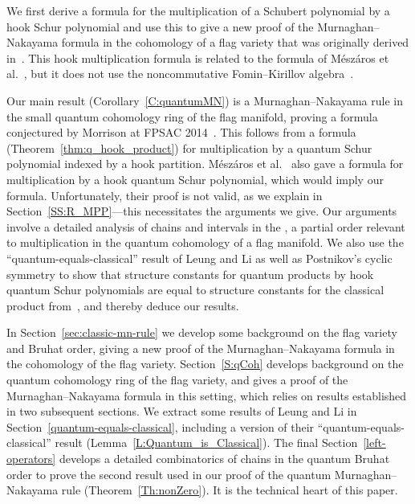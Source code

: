We first derive a formula for the multiplication of a Schubert polynomial by a hook Schur polynomial and use this to give a
new proof of the 
Murnaghan--Nakayama formula in the cohomology of a flag variety that was originally derived in~\cite{MorrisonSottile}.
This hook multiplication formula is related to the formula of M{\'e}sz{\'a}ros et al.~\cite[Thm.~2]{MPP}, but it does not use
the noncommutative Fomin--Kirillov algebra~\cite{FominKirillov}.

Our main result (Corollary~\ref{C:quantumMN}) is a Murnaghan--Nakayama rule in the small quantum cohomology
ring of the flag manifold, proving a formula conjectured by Morrison at FPSAC
2014~\cite{Morrison}.
This follows from a  formula (Theorem~\ref{thm:q_hook_product}) for multiplication by a quantum Schur polynomial indexed by
a hook partition. 
M{\'e}sz{\'a}ros et al.~\cite[Thm.~15]{MPP} also gave a formula for multiplication by a hook quantum Schur
polynomial, which would imply our formula.
Unfortunately, their proof is not valid, as we explain in Section~\ref{SS:R_MPP}---this necessitates the arguments we give.
Our arguments involve a detailed analysis of chains and intervals in the , a partial order relevant to
multiplication in the quantum cohomology of a flag manifold.
We also use the ``quantum-equals-classical'' result of Leung and Li \cite{LeungLi2012} as well as
Postnikov's cyclic symmetry \cite{Postnikov_symmetry} to show that structure constants for quantum products by hook quantum
Schur 
polynomials are equal to structure constants for the classical product from~\cite{So96}, and thereby deduce our results.

In Section~\ref{sec:classic-mn-rule} we develop some background on the flag variety and Bruhat order, giving a new proof of the
Murnaghan--Nakayama formula in the cohomology of the flag variety.
Section~\ref{S:qCoh} develops background on the quantum cohomology ring of the flag variety, and gives a proof of the 
Murnaghan--Nakayama formula in this setting, which relies on results established in two subsequent
sections.
We extract some results of Leung and Li \cite{LeungLi2012} in Section~\ref{quantum-equals-classical}, including a version
of their  ``quantum-equals-classical'' result (Lemma~\ref{L:Quantum_is_Classical}).
The final Section~\ref{left-operators} develops a detailed combinatorics of chains in the quantum Bruhat order to prove the second
result used in our proof of the quantum Murnaghan--Nakayama rule (Theorem~\ref{Th:nonZero}).
It is the technical heart of this paper.


